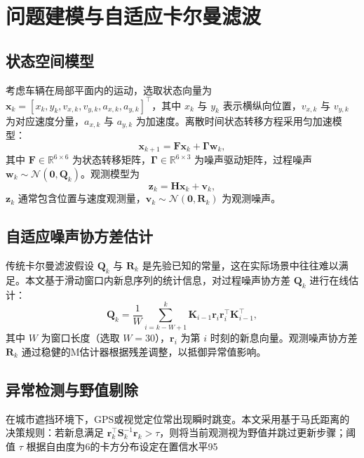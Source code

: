 \section{问题建模与自适应卡尔曼滤波}

\subsection{状态空间模型}

考虑车辆在局部平面内的运动，选取状态向量为 $\mathbf{x}_k = [x_k, y_k, v_{x,k}, v_{y,k}, a_{x,k}, a_{y,k}]^\top$，其中 $x_k$ 与 $y_k$ 表示横纵向位置，$v_{x,k}$ 与 $v_{y,k}$ 为对应速度分量，$a_{x,k}$ 与 $a_{y,k}$ 为加速度。离散时间状态转移方程采用匀加速模型：
\begin{equation}
    \mathbf{x}_{k+1} = \mathbf{F} \mathbf{x}_k + \mathbf{\Gamma} \mathbf{w}_k,
\end{equation}
其中 $\mathbf{F} \in \mathbb{R}^{6\times 6}$ 为状态转移矩阵，$\mathbf{\Gamma} \in \mathbb{R}^{6\times 3}$ 为噪声驱动矩阵，过程噪声 $\mathbf{w}_k \sim \mathcal{N}(\mathbf{0}, \mathbf{Q}_k)$。观测模型为
\begin{equation}
    \mathbf{z}_k = \mathbf{H} \mathbf{x}_k + \mathbf{v}_k,
\end{equation}
$\mathbf{z}_k$ 通常包含位置与速度观测量，$\mathbf{v}_k \sim \mathcal{N}(\mathbf{0}, \mathbf{R}_k)$ 为观测噪声。

\subsection{自适应噪声协方差估计}

传统卡尔曼滤波假设 $\mathbf{Q}_k$ 与 $\mathbf{R}_k$ 是先验已知的常量，这在实际场景中往往难以满足。本文基于滑动窗口内新息序列的统计信息，对过程噪声协方差 $\mathbf{Q}_k$ 进行在线估计：
\begin{equation}
    \hat{\mathbf{Q}}_k = \frac{1}{W} \sum_{i=k-W+1}^{k} \mathbf{K}_{i-1} \mathbf{r}_i \mathbf{r}_i^\top \mathbf{K}_{i-1}^\top,
\end{equation}
其中 $W$ 为窗口长度（选取 $W=30$），$\mathbf{r}_i$ 为第 $i$ 时刻的新息向量。观测噪声协方差 $\mathbf{R}_k$ 通过稳健的M估计器根据残差调整，以抵御异常值影响。

\subsection{异常检测与野值剔除}

在城市遮挡环境下，GPS或视觉定位常出现瞬时跳变。本文采用基于马氏距离的决策规则：若新息满足 $\mathbf{r}_k^\top \mathbf{S}_k^{-1} \mathbf{r}_k > \tau$，则将当前观测视为野值并跳过更新步骤；阈值 $\tau$ 根据自由度为6的卡方分布设定在置信水平95%